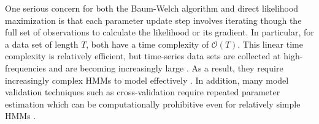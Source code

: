 

One serious concern for both the Baum-Welch algorithm and direct likelihood maximization is that each parameter update step involves iterating though the full set of observations to calculate the likelihood or its gradient. 
In particular, for a data set of length $T$, both have a time complexity of $\mathcal{O}(T)$.
This linear time complexity is relatively efficient, but time-series data sets are collected at high-frequencies and are becoming increasingly large \citep{Patterson:2017,Li:2020}. As a result, they require increasingly complex HMMs to model effectively \citep{Adam:2019,Sidrow:2021}. In addition, many model validation techniques such as cross-validation require repeated parameter estimation which can be computationally prohibitive even for relatively simple HMMs \citep{Pohle:2017}.


